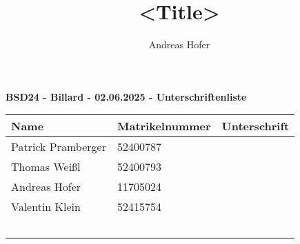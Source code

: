 \documentclass{article}
\title{\vspace{-1cm}<Title>}
\author{Andreas Hofer}
\begin{document}
\begin{center}
{\Large \textbf{ BSD24 - Billard - 02.06.2025 - Unterschriftenliste}} \\
\end{center}
\begin{tabularx}{\textwidth}{| X | X | X |}
	\toprule
	Name & Matrikelnummer & Unterschrift \\ \midrule
	Patrick Pramberger & 52400787 & \\ \hline
	Thomas Weißl & 52400793 & \\ \hline
	Andreas Hofer & 11705024 & \\ \hline
	Valentin Klein & 52415754 & \\ \hline
	&& \\ \hline
	&& \\ \hline
	&& \\ \hline
	&& \\ \hline
	&& \\ 
	
	
	\bottomrule
\end{tabularx}
	























  
\end{document}
